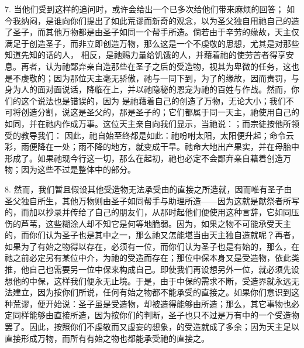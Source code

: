 7. 当他们受到这样的追问时，或许会给出一个已多次给他们带来麻烦的回答；  如今我纳闷，是谁向你们提出了如此荒谬而新奇的观念，以为圣父独自用祂自己的造了圣子，而其他万物都是由圣子如同一个帮手所造。倘若由于辛劳的缘故，天主仅满足于创造圣子，而非立即创造万物，那么这是一个不虔敬的思想，尤其是对那些知道先知的话的人， 相反，是祂赐力量给饥饿的人，并藉着祂的使劳苦者得享安息。再者，认为祂鄙弃亲自造那些在圣子之后的受造物，视其为卑微的任务，这也是不虔敬的；因为那位天主毫无骄傲，祂与一同下到，为了的缘故，因而责罚，与身为人的面对面说话，降临在上，并以祂隐秘的恩宠为祂的百姓与作战。然而，你们的这个说法也是错误的，因为 是祂藉着自己的创造了万物，无论大小；我们不可将创造分割，说这是圣父的，那是圣子的；它们都属于同一天主，祂使用自己的如同，并在祂内作成万事。这位天主亲自向我们显示，当祂说：；而宗徒按他所领受的教导我们： 因此，祂自始至终都是如此：祂吩咐太阳，太阳便升起；命令云彩，雨便降在一处；雨不降的地方，就变成干旱。祂命大地出产果实，并在母胎中形成了。如果祂现今行这一切，那么在起初，祂也必定不会鄙弃亲自藉着创造万物；因为这些不过是整体中的部分。\par

8. 然而，我们暂且假设其他受造物无法承受由的直接之所造就，因而唯有圣子由圣父独自所生，其他万物则由圣子如同帮手与助理所造——因为这就是献祭者所写的，而加以抄录并传给了自己的朋友们，从那时起他们便使用这种言辞，它如同压伤的芦苇，这些糊涂人却不知它是何等地脆弱。因为，如果之物不可能承受天主的，而你们认为圣子也是其中之一，那么祂又怎能堪当由天主独自造就呢？再者，如果为了有始之物得以存在，必须有一位，而你们认为圣子也是有始的，那么，在祂之前必定另有某位中介，为祂的受造而存在；那位中保本身又是受造物，依此类推，他自己也需要另一位中保来构成自己。即使我们再设想另外一位，就必须先设想他的中保，这样我们便永无止境。于是，由于中保的需求不断，受造界就永远无法建立，因为按你们所说，任何有始之物都不能承受的直接之。如果你们意识到这种荒谬，便开始说：圣子虽是受造物，却被造得能够由所造；那么，其它事物也必定同样能够由直接所造，因为按你们的判断，圣子也只不过是万有中的一个受造物罢了。因此，按照你们不虔敬而又虚妄的想象，的受造就成了多余；因为天主足以直接形成万物，而所有有始之物也都能承受祂的直接之。\par

